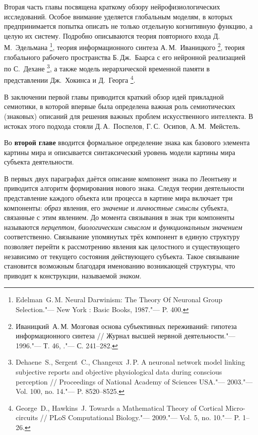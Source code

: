 Вторая часть главы посвящена краткому обзору нейрофизиологических исследований. Особое внимание уделяется глобальным моделям, в которых предпринимается попытка описать не только отдельную когнитивную функцию, а целую их систему. Подробно описываются теория повторного входа Д.\,М.~Эдельмана \footnote{Edelman~G.\,M. Neural Darwinism: The Theory Of Neuronal Group Selection."--- New York : Basic Books, 1987."--- P. 400.}, теория информационного синтеза А.\,М.~Иваницкого \footnote{Иваницкий~А.\,М. Мозговая основа субъективных переживаний: гипотеза информационного синтеза // Журнал высшей нервной деятельности."--- 1996."---	Т. 46, ."--- С. 241--282.}, теория глобального рабочего пространства Б.\,Дж.~Баарса с его нейронной реализацией по С.~Дехане \footnote{Dehaene~S., Sergent~C., Changeux~J.\,P. A neuronal network model linking subjective reports and objective physiological data during conscious perception // Proceedings of National	Academy of Sciences USA."--- 2003."--- Vol. 100, no. 14."--- P. 8520--8525.}, а также модель иерархической временной памяти в представлении Дж.~Хокинса и Д.~Георга \footnote{George~D., Hawkins~J. Towards a Mathematical Theory of Cortical Micro-circuits // PLoS Computational Biology."--- 2009."--- Vol. 5, no. 10."--- P. 1--26.}.

В заключении первой главы приводится краткий обзор идей прикладной семиотики, в которой впервые была определена важная роль семиотических (знаковых) описаний для решения важных проблем искусственного интеллекта. В истоках этого подхода стояли Д.\,А.~Поспелов, Г.\,С.~Осипов, А.\,М.~Мейстель.

Во \textbf{второй главе} вводится формальное определение знака как базового элемента картины мира и описывается синтаксический уровень модели картины мира субъекта деятельности.

В первых двух параграфах даётся описание компонент знака по Леонтьеву и приводится алгоритм формирования нового знака. Следуя теории деятельности представление каждого объекта или процесса в картине мира включает три компоненты: \textit{образ} явления, его \textit{значение} и \textit{личностные смыслы} субъекта, связанные с этим явлением. До момента связывания в знак три компоненты называются \textit{перцептом}, \textit{биологическим смыслом} и \textit{функциональным значением} соответственно. Связывание упомянутых трёх компонент в единую структуру позволяет перейти к рассмотрению явления как целостного и существующего независимо от текущего состояния действующего субъекта. Такое связывание становится возможным благодаря именованию возникающей структуры, что приводит к конструкции, называемой \textit{знаком}.

